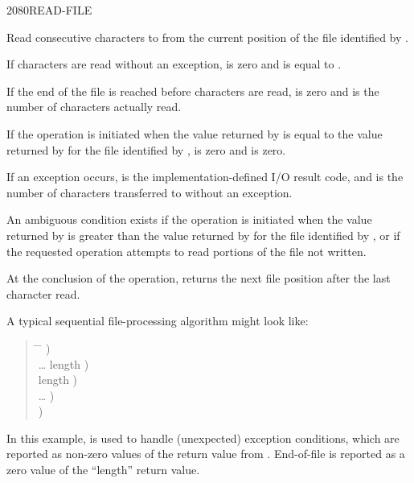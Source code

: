 \begin{worddef}{2080}{READ-FILE}
\item {}

	Read  consecutive characters to  from the
	current position of the file identified by .

	If  characters are read without an exception, 
	is zero and  is equal to .

	If the end of the file is reached before  characters are
	read,  is zero and  is the number of characters
	actually read.

	If the operation is initiated when the value returned by
	 is equal to the value returned by
	 for the file identified by ,
	 is zero and  is zero.

	If an exception occurs,  is the implementation-defined
	I/O result code, and  is the number of characters
	transferred to  without an exception.

	An ambiguous condition exists if the operation is initiated when
	the value returned by  is greater than the
	value returned by  for the file identified by
	, or if the requested operation attempts to read
	portions of the file not written.

	At the conclusion of the operation,  returns
	the next file position after the last character read.

\see {}

	\begin{rationale} %
		A typical sequential file-processing algorithm might look like:
		\begin{quote}\ttfamily{}
			\begin{tabbing}
			\tab \= \hspace{12em} \= \kill
								\>\>  ) \\
			\> {\ldots}  
											\>	  length ) \\
			 		\>\> \word{p} length ) \\
			\> {\ldots}						\>	  ) \\
								\>\>  )
			\end{tabbing}
		\end{quote}

		In this example,  is used to handle
		(unexpected) exception conditions, which are reported as
		non-zero values of the  return value from
		. End-of-file is reported as a zero value of
		the ``length'' return value.
	\end{rationale}
\end{worddef}


